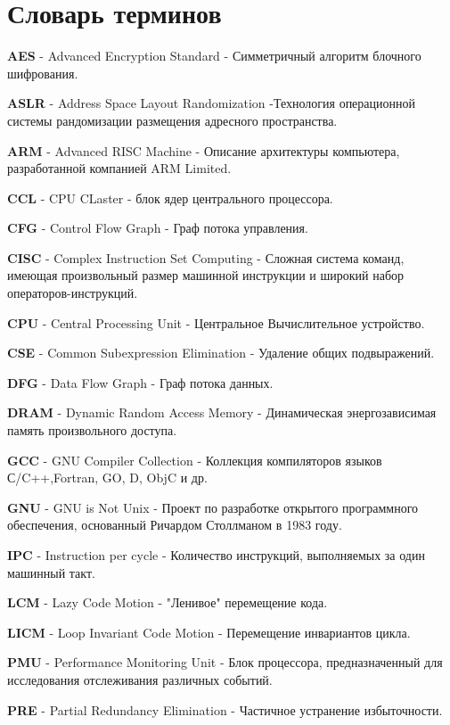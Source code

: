 \chapter*{Словарь терминов}             %

\textbf{AES} - Advanced Encryption Standard  - Симметричный алгоритм блочного шифрования.

\textbf{ASLR} - Address Space Layout Randomization -Технология операционной системы рандомизации размещения адресного пространства.

\textbf{ARM} - Advanced RISC Machine - Описание архитектуры компьютера, разработанной компанией  ARM Limited.

\textbf{CCL} - CPU CLaster - блок ядер центрального процессора.

\textbf{CFG} - Control Flow Graph - Граф потока управления.

\textbf{CISC} - Complex Instruction Set Computing  - Сложная система команд, имеющая произвольный размер машинной инструкции и широкий набор операторов-инструкций.

\textbf{CPU} - Central Processing Unit - Центральное Вычислительное устройство.

\textbf{CSE} - Common Subexpression Elimination - Удаление общих подвыражений.

\textbf{DFG} - Data Flow Graph  - Граф потока данных.

\textbf{DRAM} - Dynamic Random Access Memory - Динамическая энергозависимая память произвольного доступа.

\textbf{GCC} - GNU Compiler Collection - Коллекция компиляторов языков С/C++,Fortran, GO, D, ObjC и др.

\textbf{GNU} - GNU is Not Unix - Проект по разработке открытого программного обеспечения, основанный Ричардом Столлманом в 1983 году.

\textbf{IPC} - Instruction per cycle - Количество инструкций, выполняемых за один машинный такт. 

\textbf{LCM} - Lazy Code Motion - "Ленивое"\phantom{} перемещение кода.

\textbf{LICM} - Loop Invariant Code Motion - Перемещение инвариантов цикла.

\textbf{PMU} - Performance Monitoring Unit - Блок процессора, предназначенный для исследования отслеживания различных событий.

\textbf{PRE} - Partial Redundancy Elimination - Частичное устранение избыточности.

